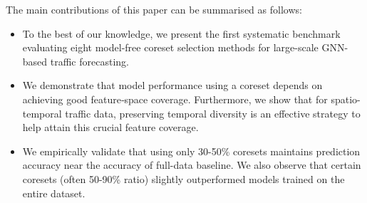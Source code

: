 The main contributions of this paper can be summarised as follows:
\begin{itemize}
    \item To the best of our knowledge, we present the first systematic benchmark evaluating eight model-free coreset selection methods for large-scale GNN-based traffic forecasting. 
    \item We demonstrate that model performance using a coreset depends on achieving good feature‐space coverage. Furthermore, we show that for spatio-temporal traffic data, preserving temporal diversity is an effective strategy to help attain this crucial feature coverage.

    \item We empirically validate that using only 30-50\% coresets maintains prediction accuracy near the accuracy of full-data baseline. We also observe that certain coresets (often 50-90\% ratio) slightly outperformed models trained on the entire dataset.
\end{itemize}